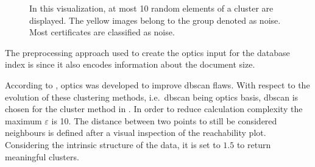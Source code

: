 \begin{figure}[!htb]
    \caption[\ac{optics} clusters]{In this visualization, at most 10 random elements of a cluster are displayed.
    The yellow images belong to the group denoted as noise.
    Most certificates are classified as noise.
    }%
    \label{fig:optics_content_cluster}%
\end{figure}


The preprocessing approach used to create the \ac{optics} input for the \databaseName{} database index is \eigendocs{} 
since it also encodes information about the document size. 

According to \citeauthor{OPTICS2014}, \ac{optics} was developed to improve \ac{dbscan} flaws.
With respect to the evolution of these clustering methods, i.e.\ \ac{dbscan} being \ac{optics} basis, 
\ac{dbscan} is chosen for the cluster method in .
In order to reduce calculation complexity the maximum $\varepsilon$ is 10.
The distance between two points to still be considered neighbours is defined after a visual inspection of the reachability plot.
Considering the intrinsic structure of the \eigendocs{} data, it is set to $1.5$ to return meaningful clusters.
